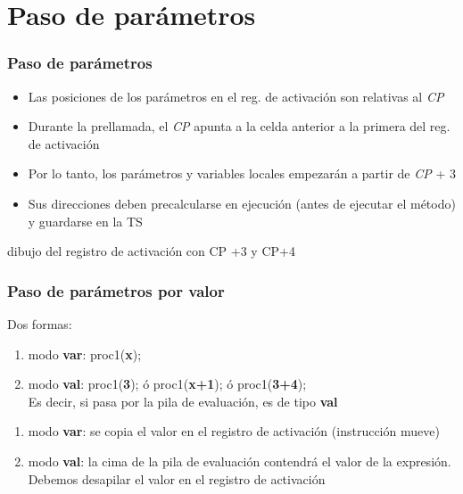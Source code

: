 \documentclass[hyperref={pdfpagelabels=false},tree-dvips]{beamer}
\begin{document}
\section{Paso de parámetros}
\begin{frame}[fragile]
\frametitle{Paso de parámetros}

\begin{itemize}[<+->]
    \item Las posiciones de los parámetros en el reg. de activación son relativas al \emph{CP}
    \item Durante la prellamada, el \emph{CP} apunta a la celda anterior a la primera del reg. de activación
    \item Por lo tanto, los parámetros y variables locales empezarán a partir de \emph{CP} + 3
    \item Sus direcciones deben precalcularse en ejecución (antes de ejecutar el método) y guardarse en la TS
\end{itemize}


dibujo del registro de activación con CP +3 y CP+4

\end{frame}
\begin{frame}[fragile]
\frametitle{Paso de parámetros por valor}

Dos formas:
\begin{enumerate}[<+->]
    \item modo \textbf{var}: proc1(\textbf{x});
    \item modo \textbf{val}: proc1(\textbf{3}); ó proc1(\textbf{x+1}); ó proc1(\textbf{3+4});\\
    Es decir, si pasa por la pila de evaluación, es de tipo \textbf{val}
\end{enumerate}

\begin{enumerate}[<+->]
    \item modo \textbf{var}: se copia el valor en el
registro de activación (instrucción mueve)
    \item modo \textbf{val}: la cima de la pila de
evaluación contendrá el valor de la expresión. Debemos desapilar el valor en el registro de activación
\end{enumerate}

\end{frame}
\end{document}
